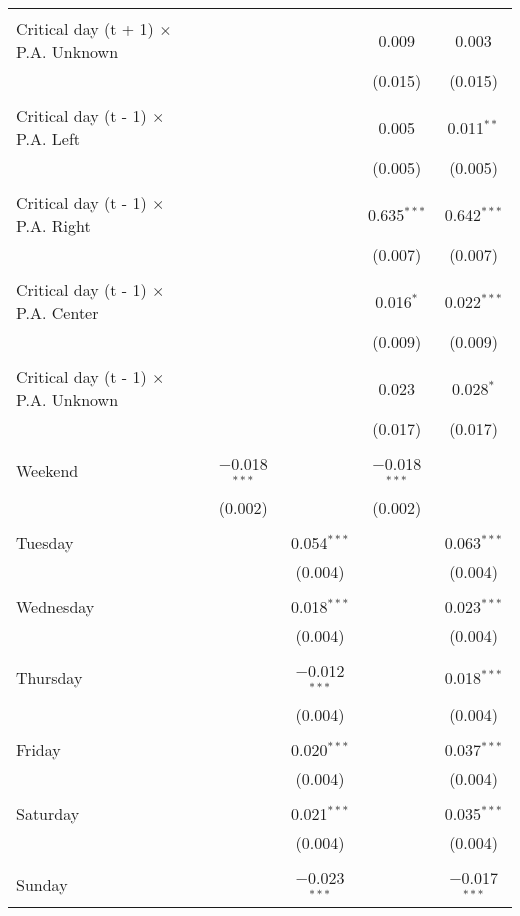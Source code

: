 \documentclass[
]{article}
\begin{document}
\begin{table}[!htbp]
{\begin{tabular}{@{\extracolsep{5pt}}lcccc}
  & & & & \\ 
 Critical day (t + 1) $\times$ P.A. Unknown &  &  & 0.009 & 0.003 \\ 
  &  &  & (0.015) & (0.015) \\ 
  & & & & \\ 
 Critical day (t - 1) $\times$ P.A. Left &  &  & 0.005 & 0.011$^{**}$ \\ 
  &  &  & (0.005) & (0.005) \\ 
  & & & & \\ 
 Critical day (t - 1) $\times$ P.A. Right &  &  & 0.635$^{***}$ & 0.642$^{***}$ \\ 
  &  &  & (0.007) & (0.007) \\ 
  & & & & \\ 
 Critical day (t - 1) $\times$ P.A. Center &  &  & 0.016$^{*}$ & 0.022$^{***}$ \\ 
  &  &  & (0.009) & (0.009) \\ 
  & & & & \\ 
 Critical day (t - 1) $\times$ P.A. Unknown &  &  & 0.023 & 0.028$^{*}$ \\ 
  &  &  & (0.017) & (0.017) \\ 
  & & & & \\ 
 Weekend & $-$0.018$^{***}$ &  & $-$0.018$^{***}$ &  \\ 
  & (0.002) &  & (0.002) &  \\ 
  & & & & \\ 
 Tuesday &  & 0.054$^{***}$ &  & 0.063$^{***}$ \\ 
  &  & (0.004) &  & (0.004) \\ 
  & & & & \\ 
 Wednesday &  & 0.018$^{***}$ &  & 0.023$^{***}$ \\ 
  &  & (0.004) &  & (0.004) \\ 
  & & & & \\ 
 Thursday &  & $-$0.012$^{***}$ &  & 0.018$^{***}$ \\ 
  &  & (0.004) &  & (0.004) \\ 
  & & & & \\ 
 Friday &  & 0.020$^{***}$ &  & 0.037$^{***}$ \\ 
  &  & (0.004) &  & (0.004) \\ 
  & & & & \\ 
 Saturday &  & 0.021$^{***}$ &  & 0.035$^{***}$ \\ 
  &  & (0.004) &  & (0.004) \\ 
  & & & & \\ 
 Sunday &  & $-$0.023$^{***}$ &  & $-$0.017$^{***}$ \\ 

\end{tabular}}
\end{table}
\end{document}
